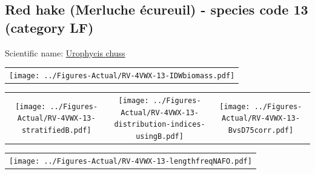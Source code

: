 \documentclass[12pt]{article}\usepackage[]{graphicx}\usepackage[]{color}
\begin{document}
\renewcommand\thefigure{\thesubsection\Alph{figure}}

\setcounter{figure}{0}

\hypertarget{sec:13}{%
\subsection{Red hake (Merluche écureuil) - species code 13 (category LF)}\label{sec:13}}

  


Scientific name: \href{http://www.marinespecies.org/aphia.php?p=taxdetails\&id=126503}{Urophycis chuss} \newline
\begin{minipage}{1.0\textwidth}
 \begin{tabular}{c}
\texttt{[image: ../Figures-Actual/RV-4VWX-13-IDWbiomass.pdf]} \\ 
\end{tabular} 
\end{minipage}
\newline

\vspace{1cm}
\begin{minipage}{1.0\textwidth}
 \begin{tabular}{ccc}
\texttt{[image: ../Figures-Actual/RV-4VWX-13-stratifiedB.pdf]} & 
\texttt{[image: ../Figures-Actual/RV-4VWX-13-distribution-indices-usingB.pdf]} & 
\texttt{[image: ../Figures-Actual/RV-4VWX-13-BvsD75corr.pdf]} \\ 
\end{tabular} 
\end{minipage}
\clearpage
\begin{minipage}{1.0\textwidth}
 \begin{tabular}{c}
\texttt{[image: ../Figures-Actual/RV-4VWX-13-lengthfreqNAFO.pdf]} \\ 
\end{tabular} 
\end{minipage}
\newline
\end{document}
